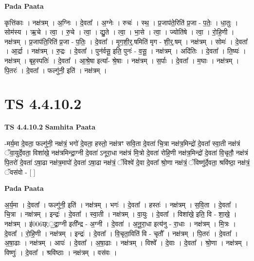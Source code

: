 \documentclass[17pt]{extarticle}
\begin{document}
\textbf{Pada Paata} \newline

कृत्ति॑काः । नक्ष॑त्रम् । अ॒ग्निः । दे॒वता᳚ । अ॒ग्नेः । रुचः॑ । स्थ॒ । प्र॒जाप॑ते॒रिति॑ प्र॒जा - प॒तेः॒ । धा॒तुः । सोम॑स्य । ऋ॒चे । त्वा॒ । रु॒चे । त्वा॒ । द्यु॒ते । त्वा॒ । भा॒से । त्वा॒ । ज्योति॑षे । त्वा॒ । रो॒हि॒णी । नक्ष॑त्रम् । प्र॒जाप॑ति॒रिति॑ प्र॒जा - प॒तिः॒ । दे॒वता᳚ । मृ॒ग॒शी॒र्॒.षमिति॑ मृग - शी॒र्॒.षम् । नक्ष॑त्रम् । सोमः॑ । दे॒वता᳚ । आ॒र्द्रा । नक्ष॑त्रम् । रु॒द्रः । दे॒वता᳚ । पुन॑र्वसू॒ इति॒ पुनः॑ - व॒सू॒ । नक्ष॑त्रम् । अदि॑तिः । दे॒वता᳚ । ति॒ष्यः॑ । नक्ष॑त्रम् । बृह॒स्पतिः॑ । दे॒वता᳚ । आ॒श्रे॒षा इत्या᳚- श्रे॒षाः । नक्ष॑त्रम् । स॒र्पाः । दे॒वता᳚ । म॒घाः । नक्ष॑त्रम् । पि॒तरः॑ । दे॒वता᳚ । फल्गु॑नी॒ इति॑ । नक्ष॑त्रम् ।  \newline




\section*{ TS 4.4.10.2 }

\textbf{TS 4.4.10.2 } \newline
\textbf{Samhita Paata} \newline

-मर्य॒मा दे॒वता॒ फल्गु॑नी॒ नक्ष॑त्रं॒ भगो॑ दे॒वता॒ हस्तो॒ नक्ष॑त्रꣳ सवि॒ता दे॒वता॑ चि॒त्रा नक्ष॑त्र॒मिन्द्रो॑ दे॒वता᳚ स्वा॒ती नक्ष॑त्रं ॅवा॒युर्दे॒वता॒ विशा॑खे॒ नक्ष॑त्रमिन्द्रा॒ग्नी दे॒वता॑ ऽनूरा॒धा नक्ष॑त्रं मि॒त्रो दे॒वता॑ रोहि॒णी नक्ष॑त्र॒मिन्द्रो॑ दे॒वता॑ वि॒चृतौ॒ नक्ष॑त्रं पि॒तरो॑ दे॒वता॑ ऽषा॒ढा नक्ष॑त्र॒मापो॑ दे॒वता॑ ऽषा॒ढा नक्ष॑त्रं॒ ॅविश्वे॑ दे॒वा दे॒वता᳚ श्रो॒णा नक्ष॑त्रं॒ ॅविष्णु॑र्दे॒वता॒ श्रवि॑ष्ठा॒ नक्ष॑त्रं॒ ॅवस॑वो - [  ] \newline

\textbf{Pada Paata} \newline

अ॒र्य॒मा । दे॒वता᳚ । फल्गु॑नी॒ इति॑ । नक्ष॑त्रम् । भगः॑ । दे॒वता᳚ । हस्तः॑ । नक्ष॑त्रम् । स॒वि॒ता । दे॒वता᳚ । चि॒त्रा । नक्ष॑त्रम् । इन्द्रः॑ । दे॒वता᳚ । स्वा॒ती । नक्ष॑त्रम् । वा॒युः । दे॒वता᳚ । विशा॑खे॒ इति॒ वि - शा॒खे॒ । नक्ष॑त्रम् । इ॑006छ्;॒द्रा॒ग्नी इती᳚न्द्र - अ॒ग्नी । दे॒वता॑ । अ॒नू॒रा॒धा इत्य॑नु - रा॒धाः । नक्ष॑त्रम् । मि॒त्रः । दे॒वता᳚ । रो॒हि॒णी । नक्ष॑त्रम् । इन्द्रः॑ । दे॒वता᳚ । वि॒चृता॒विति॑ वि - चृतौ᳚ । नक्ष॑त्रम् । पि॒तरः॑ । दे॒वता᳚ । अ॒षा॒ढाः । नक्ष॑त्रम् । आपः॑ । दे॒वता᳚ । अ॒षा॒ढाः । नक्ष॑त्रम् । विश्वे᳚ । दे॒वाः । दे॒वता᳚ । श्रो॒णा । नक्ष॑त्रम् । विष्णुः॑ । दे॒वता᳚ । श्रवि॑ष्ठाः । नक्ष॑त्रम् । वस॑वः ।  \newline
\end{document}
